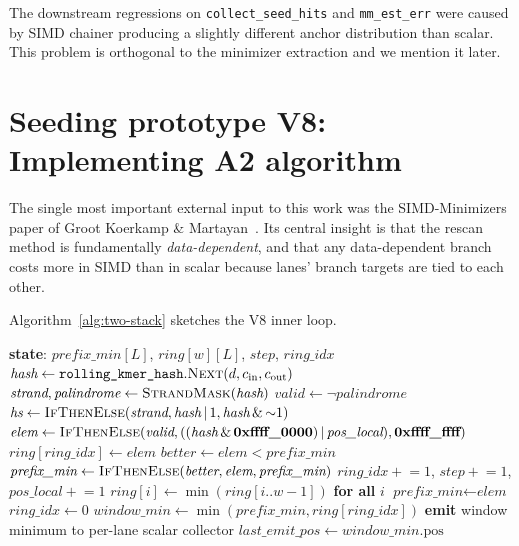The downstream regressions on \texttt{collect\_seed\_hits} and
\texttt{mm\_est\_err} were caused by SIMD chainer producing a slightly
different anchor distribution than scalar. This problem is orthogonal to the minimizer extraction and we mention it later.

\section{Seeding prototype V8: Implementing A2 algorithm}
\label{sec:v8-two-stack}

The single most important external input to this work was the
SIMD-Minimizers paper of Groot Koerkamp \&
Martayan~\cite{groot_koerkamp_simd_minimizers_2025}.  Its central
insight is that the rescan method is fundamentally
\emph{data-dependent}, and that any data-dependent branch costs more
in SIMD than in scalar because lanes' branch targets are tied to
each other.

Algorithm~\ref{alg:two-stack} sketches the V8 inner loop.

\begin{algorithm}[H]
\caption{V8 \texttt{collect\_minimizers\_two\_stack\_simd} (per-step body)}
\label{alg:two-stack}
\small
\begin{algorithmic}[1]
\State \textbf{state}: $\textit{prefix\_min}[L]$, $\textit{ring}[w][L]$, $\textit{step}$, $\textit{ring\_idx}$
\State $\textit{hash} \gets \texttt{rolling\_kmer\_hash}.\textsc{Next}(d, c_\text{in}, c_\text{out})$
\State $\textit{strand}, \textit{palindrome} \gets \textsc{StrandMask}(\textit{hash})$
\State $\textit{valid} \gets \neg\textit{palindrome}$
\State $\textit{hs} \gets \textsc{IfThenElse}(\textit{strand}, \textit{hash}\,|\,1, \textit{hash}\,\&\,{\sim}1)$ 
\State $\textit{elem} \gets \textsc{IfThenElse}(\textit{valid}, ((\textit{hash}\,\&\,\textbf{0xffff\_0000})\,|\,\textit{pos\_local}), \textbf{0xffff\_ffff})$
\State $\textit{ring}[\textit{ring\_idx}] \gets \textit{elem}$ 
\State $\textit{better} \gets \textit{elem} < \textit{prefix\_min}$
\State $\textit{prefix\_min} \gets \textsc{IfThenElse}(\textit{better}, \textit{elem}, \textit{prefix\_min})$
\State $\textit{ring\_idx} \mathrel{+}= 1$, $\textit{step} \mathrel{+}= 1$, $\textit{pos\_local} \mathrel{+}= 1$
                                          
    \State $\textit{ring}[i] \gets \min(\textit{ring}[i..w-1])$ \textbf{for all} $i$ 
    \State $\textit{prefix\_min} \gets \textit{elem}$
    \State $\textit{ring\_idx} \gets 0$
\EndIf
\State $\textit{window\_min} \gets \min(\textit{prefix\_min}, \textit{ring}[\textit{ring\_idx}])$
    \State \textbf{emit} window minimum to per-lane scalar collector
    \State $\textit{last\_emit\_pos} \gets \textit{window\_min}.\text{pos}$
\EndIf
\end{algorithmic}
\end{algorithm}

